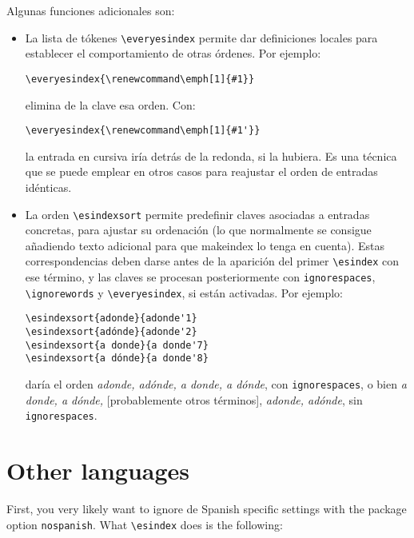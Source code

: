 \documentclass[a4paper]{ltxguide}
\begin{document}
Algunas funciones adicionales son:
\begin{itemize}
\item La lista de tókenes \verb|\everyesindex| permite dar definiciones
locales para establecer el comportamiento de otras órdenes. Por
ejemplo:
\begin{verbatim}
\everyesindex{\renewcommand\emph[1]{#1}}
\end{verbatim}
elimina de la clave esa orden. Con:
\begin{verbatim}
\everyesindex{\renewcommand\emph[1]{#1'}}
\end{verbatim}
la entrada en cursiva iría detrás de la redonda, si la hubiera. Es una
técnica que se puede emplear en otros casos para reajustar el orden de
entradas idénticas.

\item La orden \verb|\esindexsort| permite predefinir claves asociadas
a entradas concretas, para ajustar su ordenación (lo que normalmente se
consigue añadiendo texto adicional para que \textsf{makeindex} lo tenga
en cuenta). Estas correspondencias deben darse antes de la aparición
del primer \verb|\esindex| con ese término, y las claves se procesan
posteriormente con \verb|ignorespaces|, \verb|\ignorewords| y
\verb|\everyesindex|, si están activadas. Por ejemplo:
\begin{verbatim}
\esindexsort{adonde}{adonde'1}
\esindexsort{adónde}{adonde'2}
\esindexsort{a donde}{a donde'7}
\esindexsort{a dónde}{a donde'8}
\end{verbatim}
daría el orden \emph{adonde, adónde, a donde, a dónde}, con
\verb|ignorespaces|, o bien \emph{a donde, a dónde,} [probablemente
otros términos], \emph{adonde, adónde}, sin \verb|ignorespaces|.
\end{itemize}

\section{Other languages}

First, you very likely want to ignore de Spanish specific settings with
the package option \verb|nospanish|. What \verb|\esindex| does is the
following:
\end{document}
